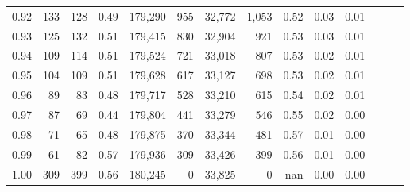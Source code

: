 \begin{tabular}{rrrrrrrrrrrrrr}
0.92 &    133 &  128 &  0.49 &  179,290 &      955 &  32,772 &   1,053 &  0.52 &  0.03 &      0.01 \\
0.93 &    125 &  132 &  0.51 &  179,415 &      830 &  32,904 &     921 &  0.53 &  0.03 &      0.01 \\
0.94 &    109 &  114 &  0.51 &  179,524 &      721 &  33,018 &     807 &  0.53 &  0.02 &      0.01 \\
0.95 &    104 &  109 &  0.51 &  179,628 &      617 &  33,127 &     698 &  0.53 &  0.02 &      0.01 \\
0.96 &     89 &   83 &  0.48 &  179,717 &      528 &  33,210 &     615 &  0.54 &  0.02 &      0.01 \\
0.97 &     87 &   69 &  0.44 &  179,804 &      441 &  33,279 &     546 &  0.55 &  0.02 &      0.00 \\
0.98 &     71 &   65 &  0.48 &  179,875 &      370 &  33,344 &     481 &  0.57 &  0.01 &      0.00 \\
0.99 &     61 &   82 &  0.57 &  179,936 &      309 &  33,426 &     399 &  0.56 &  0.01 &      0.00 \\
1.00 &    309 &  399 &  0.56 &  180,245 &        0 &  33,825 &       0 &   nan &  0.00 &      0.00 \\
\bottomrule
\end{tabular}
